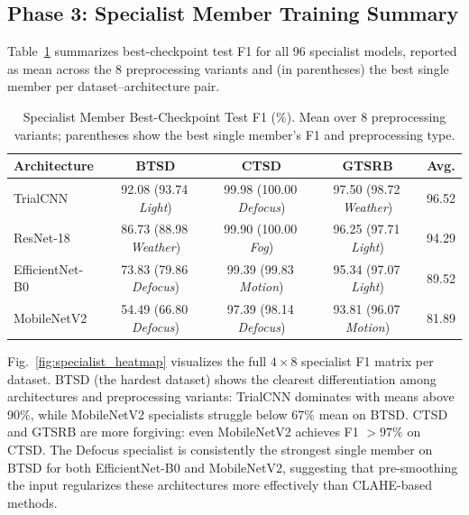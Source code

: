 \documentclass[conference]{IEEEtran}
\begin{document}
\subsection{Phase 3: Specialist Member Training Summary}

Table~\ref{tab:specialist_summary} summarizes best-checkpoint test F1 for all 96 specialist models, reported as mean across the 8 preprocessing variants and (in parentheses) the best single member per dataset--architecture pair.

\begin{table}[htbp]
\caption{Specialist Member Best-Checkpoint Test F1 (\%). Mean over 8 preprocessing variants; parentheses show the best single member's F1 and preprocessing type.}
\label{tab:specialist_summary}
\begin{center}
\setlength\tabcolsep{5pt}
\begin{tabular}{lcccc}
\toprule
\textbf{Architecture} & \textbf{BTSD} & \textbf{CTSD} & \textbf{GTSRB} & \textbf{Avg.} \\
\midrule
TrialCNN        & 92.08 (93.74\,\textit{Light}) & 99.98 (100.00\,\textit{Defocus}) & 97.50 (98.72\,\textit{Weather}) & 96.52 \\
ResNet-18       & 86.73 (88.98\,\textit{Weather}) & 99.90 (100.00\,\textit{Fog}) & 96.25 (97.71\,\textit{Light}) & 94.29 \\
EfficientNet-B0 & 73.83 (79.86\,\textit{Defocus}) & 99.39 (99.83\,\textit{Motion}) & 95.34 (97.07\,\textit{Light}) & 89.52 \\
MobileNetV2     & 54.49 (66.80\,\textit{Defocus}) & 97.39 (98.14\,\textit{Defocus}) & 93.81 (96.07\,\textit{Motion}) & 81.89 \\
\bottomrule
\end{tabular}
\end{center}
\end{table}

Fig.~\ref{fig:specialist_heatmap} visualizes the full $4\times8$ specialist F1 matrix per dataset. BTSD (the hardest dataset) shows the clearest differentiation among architectures and preprocessing variants: TrialCNN dominates with means above 90\%, while MobileNetV2 specialists struggle below 67\% mean on BTSD. CTSD and GTSRB are more forgiving: even MobileNetV2 achieves F1 $>97\%$ on CTSD. The Defocus specialist is consistently the strongest single member on BTSD for both EfficientNet-B0 and MobileNetV2, suggesting that pre-smoothing the input regularizes these architectures more effectively than CLAHE-based methods.
\end{document}
